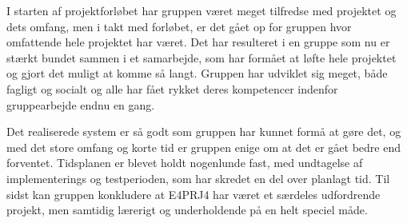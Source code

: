 I starten af projektforløbet har gruppen været meget tilfredse med projektet og dets omfang, men i takt med forløbet, er det gået op for gruppen hvor omfattende hele projektet har været. 
Det har resulteret i en gruppe som nu er stærkt bundet sammen i et samarbejde, som har formået at løfte hele projektet og gjort det muligt at komme så langt. Gruppen har udviklet sig meget, både fagligt og socialt og alle har fået rykket deres kompetencer indenfor gruppearbejde endnu en gang.

Det realiserede system er så godt som gruppen har kunnet formå at gøre det, og med det store omfang og korte tid er gruppen enige om at det er gået bedre end forventet. 
Tidsplanen er blevet holdt nogenlunde fast, med undtagelse af implementerings og testperioden, som har skredet en del over planlagt tid. Til sidst kan gruppen konkludere at E4PRJ4 har været et særdeles udfordrende projekt, men samtidig lærerigt og underholdende på en helt speciel måde.

\clearpage